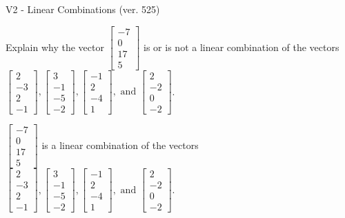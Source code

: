 \begin{exercise}
  \begin{exerciseTitle}V2 - Linear Combinations (ver. 525)\end{exerciseTitle}
  \begin{exerciseStatement}
    Explain why the vector \(\left[\begin{array}{c}
-7 \\
0 \\
17 \\
5
\end{array}\right]\)  is or is not a linear 
	combination of the vectors \(\left[\begin{array}{c}
2 \\
-3 \\
2 \\
-1
\end{array}\right] , \left[\begin{array}{c}
3 \\
-1 \\
-5 \\
-2
\end{array}\right] , \left[\begin{array}{c}
-1 \\
2 \\
-4 \\
1
\end{array}\right] , \text{ and } \left[\begin{array}{c}
2 \\
-2 \\
0 \\
-2
\end{array}\right]\).
	


  \end{exerciseStatement}
  \begin{exerciseAnswer}
   \(\left[\begin{array}{c}
-7 \\
0 \\
17 \\
5
\end{array}\right]\) 
  	 is  
	a linear combination of the vectors \(\left[\begin{array}{c}
2 \\
-3 \\
2 \\
-1
\end{array}\right] , \left[\begin{array}{c}
3 \\
-1 \\
-5 \\
-2
\end{array}\right] , \left[\begin{array}{c}
-1 \\
2 \\
-4 \\
1
\end{array}\right] , \text{ and } \left[\begin{array}{c}
2 \\
-2 \\
0 \\
-2
\end{array}\right]\).


\end{exerciseAnswer}
\end{exercise}
